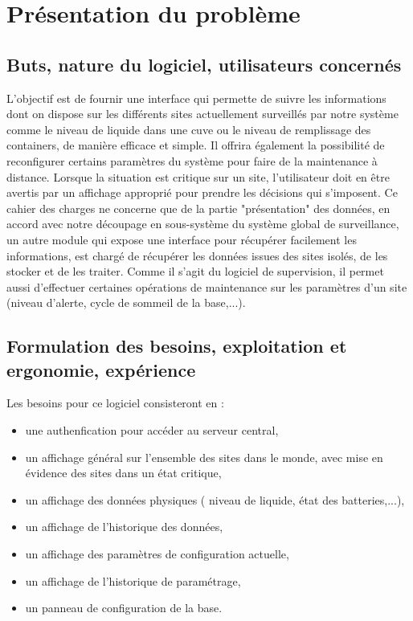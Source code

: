 \section{Présentation du problème}
\subsection{Buts, nature du logiciel, utilisateurs concernés}
L'objectif est de fournir une interface qui permette de suivre les informations dont on dispose sur les différents sites actuellement surveillés par notre système comme le niveau de liquide dans une cuve ou le niveau de remplissage des containers, de manière efficace et simple. Il offrira également la possibilité de reconfigurer certains paramètres du système pour faire de la maintenance à distance.
Lorsque la situation est critique sur un site, l'utilisateur doit en être avertis par un affichage approprié pour prendre les décisions qui s'imposent.
Ce cahier des charges ne concerne que de la partie "présentation" des données, en accord avec notre découpage en sous-système du système global de surveillance, un autre module  qui expose une interface pour récupérer facilement les informations, est chargé de récupérer les données issues des sites isolés, de les stocker et de les traiter.
Comme il s'agit du logiciel de supervision, il permet aussi d'effectuer certaines opérations de maintenance sur les paramètres d'un site (niveau d'alerte, cycle de sommeil de la base,...).

\subsection{Formulation des besoins, exploitation et ergonomie, expérience}
Les besoins pour ce logiciel consisteront en :
\begin{itemize}
	\item une authenfication pour accéder au serveur central,
	\item un affichage général sur l'ensemble des sites dans le monde, avec mise en évidence des sites dans un état critique,
	\item un affichage des données physiques ( niveau de liquide, état des batteries,...),
	\item un affichage de l'historique des données,
	\item un affichage des paramètres de configuration actuelle,
	\item un affichage de l'historique de paramétrage,
	\item un panneau de configuration de la base.
\end{itemize}

